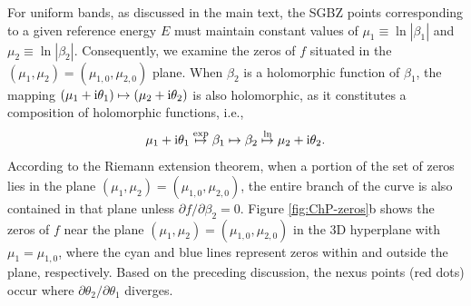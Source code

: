 \documentclass[pdflatex,sn-nature, iicol]{sn-jnl}%
\theoremstyle{thmstyleone}%
\theoremstyle{thmstyletwo}%
\theoremstyle{thmstylethree}%
\begin{document}
For uniform bands, as discussed in the main text, the SGBZ points
corresponding to a given reference energy $E$ must maintain constant
values of $\mu_{1}\equiv\ln|\beta_{1}|$ and $\mu_{2}\equiv\ln|\beta_{2}|$.
Consequently, we examine the zeros of $f$ situated in the $(\mu_{1},\mu_{2})=(\mu_{1,0},\mu_{2,0})$
plane. When $\beta_{2}$ is a holomorphic function of $\beta_{1}$,
the mapping $(\mu_{1}+\mathrm{i}\theta_{1})\mapsto(\mu_{2}+\mathrm{i}\theta_{2})$
is also holomorphic, as it constitutes a composition of holomorphic
functions, i.e., 
\begin{equation}
\mu_{1}+\mathrm{i}\theta_{1}\overset{\exp}{\mapsto}\beta_{1}\mapsto\beta_{2}\overset{\ln}{\mapsto}\mu_{2}+\mathrm{i}\theta_{2}.
\end{equation}
According to the Riemann extension theorem, when a portion of the
set of zeros lies in the plane $(\mu_{1},\mu_{2})=(\mu_{1,0},\mu_{2,0})$,
the entire branch of the curve is also contained in that plane unless
$\partial f/\partial\beta_{2}=0$. Figure \ref{fig:ChP-zeros}b shows
the zeros of $f$ near the plane $(\mu_{1},\mu_{2})=(\mu_{1,0},\mu_{2,0})$
in the 3D hyperplane with $\mu_{1}=\mu_{1,0}$, where the cyan and
blue lines represent zeros within and outside the plane, respectively.
Based on the preceding discussion, the nexus points (red dots) occur
where $\partial\theta_{2}/\partial\theta_{1}$ diverges.
\end{document}
